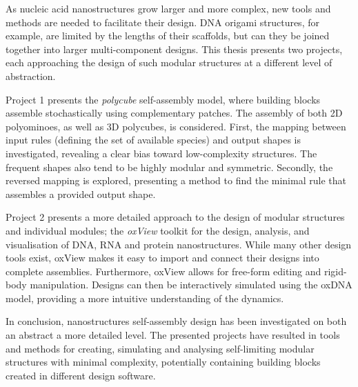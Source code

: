 
As nucleic acid nanostructures grow larger and more complex, new tools and methods are needed to facilitate their design. DNA origami structures, for example, are limited by the lengths of their scaffolds, but can they be joined together into larger multi-component designs. This thesis presents two projects, each approaching the design of such modular structures at a different level of abstraction.

Project 1 presents the \emph{polycube} self-assembly model, where building blocks assemble stochastically using complementary patches. The assembly of both 2D polyominoes, as well as 3D polycubes, is considered. First, the mapping between input rules (defining the set of available species) and output shapes is investigated, revealing a clear bias toward low-complexity structures. The frequent shapes also tend to be highly modular and symmetric. Secondly, the reversed mapping is explored, presenting a method to find the minimal rule that assembles a provided output shape.

Project 2 presents a more detailed approach to the design of modular structures and individual modules; the \emph{oxView} toolkit for the design, analysis, and visualisation of DNA, RNA and protein nanostructures. While many other design tools exist, oxView makes it easy to import and connect their designs into complete assemblies. Furthermore, oxView allows for free-form editing and rigid-body manipulation. Designs can then be interactively simulated using the oxDNA model, providing a more intuitive understanding of the dynamics.

In conclusion, nanostructures self-assembly design has been investigated on both an abstract a more detailed level. The presented projects have resulted in tools and methods for creating, simulating and analysing self-limiting modular structures with minimal complexity, potentially containing building blocks created in different design software.